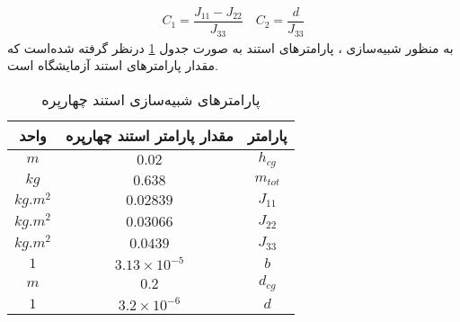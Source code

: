 \begin{align*}
	C_1 =\dfrac{J_{11}-J_{22}}{J_{33}}\quad
	C_2 =\dfrac{d}{J_{33}}
\end{align*}
به منظور شبیه‌سازی ، پارامترهای استند به صورت جدول 
\ref{parameterstable}
درنظر گرفته شده‌است که 
مقدار پارامترهای استند آزمایشگاه است.
\begin{table}[H]
	\caption {پارامترهای شبیه‌سازی استند چهارپره\cite{norian}} 
	\label{parameterstable}
	\begin{center}
		\begin{tabular}{ |c|c|c| }
			\hline
	واحد & مقدار پارامتر استند چهارپره& پارامتر    \\
			\hline
			$m$  &$0.02$ & $h_{cg}$   \\
			\hline
			 $kg$& $0.638$ & $m_{tot}$  \\
			\hline
			 $kg.m^2$& $0.02839$ & $J_{11}$  \\
			\hline
			 $kg.m^2$& $0.03066$ & $J_{22}$  \\
			\hline
			 $kg.m^2$&$0.0439$ & $J_{33}$  \\
			\hline
			  $1$ &$3.13\times10^{-5}$ & $b$ \\
			\hline
			$m$ &$0.2$ & $d_{cg}$   \\
			\hline
			 $1$&$3.2\times10^{-6}$ & $d$  \\
			\hline
		\end{tabular}
	\end{center}
\end{table}


